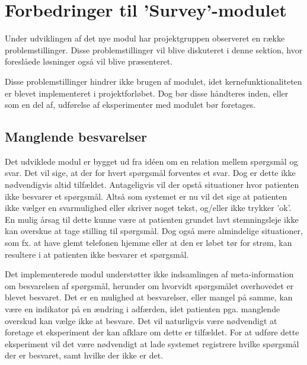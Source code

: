 
\section{Forbedringer til 'Survey'-modulet}
Under udviklingen af det nye modul har projektgruppen observeret en række problemstillinger.
Disse problemstillinger vil blive diskuteret i denne sektion, hvor foreslåede løsninger også vil blive præsenteret.

Disse problemstillinger hindrer ikke brugen af modulet, idet kernefunktionaliteten er blevet implementeret i projektforløbet.
Dog bør disse håndteres inden, eller som en del af, udførelse af eksperimenter med modulet bør foretages.

\subsection{Manglende besvarelser}
Det udviklede modul er bygget ud fra idéen om en relation mellem spørgsmål og svar.
Det vil sige, at der for hvert spørgsmål forventes et svar.
Dog er dette ikke nødvendigvis altid tilfældet.
Antageligvis vil der opstå situationer hvor patienten ikke besvarer et spørgsmål.
Altså som systemet er nu vil det sige at patienten ikke vælger en svarmulighed eller skriver noget tekst, og/eller ikke trykker 'ok'.
En mulig årsag til dette kunne være at patienten grundet lavt stemningsleje ikke kan overskue at tage stilling til spørgsmål.
Dog også mere almindelige situationer, som fx. at have glemt telefonen hjemme eller at den er løbet tør for strøm, kan resultere i at patienten ikke besvarer et spørgsmål.

Det implementerede modul understøtter ikke indsamlingen af meta-information om besvarelsen af spørgsmål, herunder om hvorvidt spørgsmålet overhovedet er blevet besvaret.
Det er en mulighed at besvarelser, eller mangel på samme, kan være en indikator på en ændring i adfærden, idet patienten pga. manglende overskud kan vælge ikke at besvare.
Det vil naturligvis være nødvendigt at foretage et eksperiment der kan afklare om dette er tilfældet.
For at udføre dette eksperiment vil det være nødvendigt at lade systemet registrere hvilke spørgsmål der er besvaret, samt hvilke der ikke er det.

